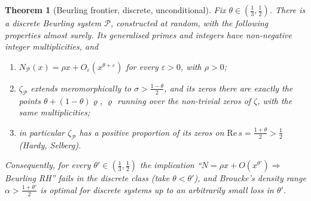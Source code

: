 \documentclass[11pt]{amsart}
\newtheorem{theorem}{Theorem}[section]
\theoremstyle{definition}
\theoremstyle{remark}
\newcommand{\Rel}{\mathrm{Re}\,}
\begin{document}
\begin{theorem}[Beurling frontier, discrete, unconditional]\label{thm:BFdisc}
Fix $\theta\in(\frac13,\frac12)$. There is a discrete Beurling system $\mathcal P$, constructed at random, with the
following properties almost surely. Its generalised primes and integers have non-negative integer multiplicities, and
\begin{enumerate}
\item[(i)] $N_{\mathcal P}(x)=\rho x+O_\varepsilon(x^{\theta+\varepsilon})$ for every $\varepsilon>0$, with $\rho>0$;
\item[(ii)] $\zeta_{\mathcal P}$ extends meromorphically to $\sigma>\frac{1-\theta}2$, and its zeros there are exactly the points
$\theta+(1-\theta)\varrho$, $\varrho$ running over the non-trivial zeros of $\zeta$, with the same multiplicities;
\item[(iii)] in particular $\zeta_{\mathcal P}$ has a positive proportion of its zeros on $\Rel s=\frac{1+\theta}2>\frac12$ (Hardy, Selberg).
\end{enumerate}
Consequently, for every $\theta'\in(\frac13,\frac12)$ the implication ``$N=\rho x+O(x^{\theta'})\Rightarrow$ Beurling RH'' fails in
the discrete class (take $\theta<\theta'$), and Broucke's density range $\alpha>\frac{1+\theta'}2$ \cite{Broucke2024} is optimal for
discrete systems up to an arbitrarily small loss in $\theta'$.
\end{theorem}
\end{document}

